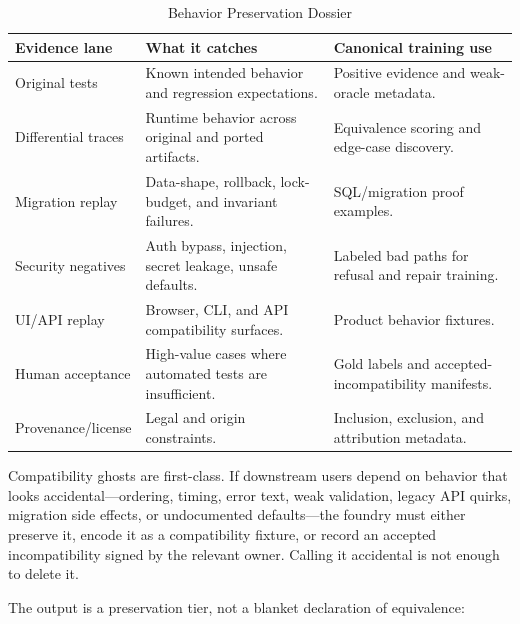 \begin{table}[t]
\caption{Behavior Preservation Dossier}
\label{tab:behaviorpreservation}
\centering
\footnotesize
\begin{tabularx}{\textwidth}{p{}X X}
\toprule
Evidence lane & What it catches & Canonical training use \\
\midrule
Original tests & Known intended behavior and regression expectations. & Positive evidence and weak-oracle metadata. \\
Differential traces & Runtime behavior across original and ported artifacts. & Equivalence scoring and edge-case discovery. \\
Migration replay & Data-shape, rollback, lock-budget, and invariant failures. & SQL/migration proof examples. \\
Security negatives & Auth bypass, injection, secret leakage, unsafe defaults. & Labeled bad paths for refusal and repair training. \\
UI/API replay & Browser, CLI, and API compatibility surfaces. & Product behavior fixtures. \\
Human acceptance & High-value cases where automated tests are insufficient. & Gold labels and accepted-incompatibility manifests. \\
Provenance/license & Legal and origin constraints. & Inclusion, exclusion, and attribution metadata. \\
\bottomrule
\end{tabularx}
\end{table}

Compatibility ghosts are first-class. If downstream users depend on behavior that looks accidental---ordering, timing, error text, weak validation, legacy API quirks, migration side effects, or undocumented defaults---the foundry must either preserve it, encode it as a compatibility fixture, or record an accepted incompatibility signed by the relevant owner. Calling it accidental is not enough to delete it.

The output is a preservation tier, not a blanket declaration of equivalence:

